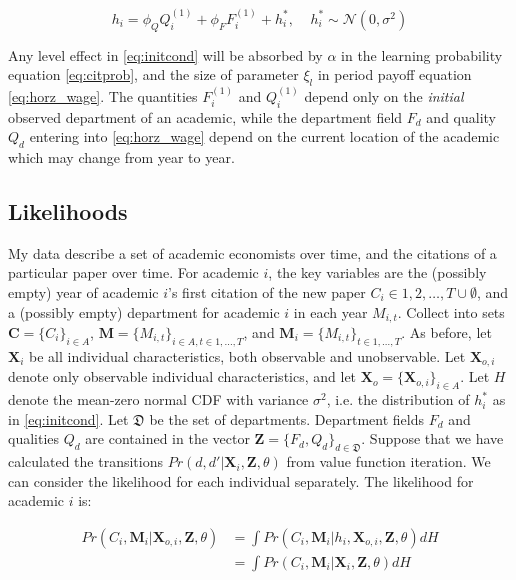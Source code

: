 \begin{equation}
    h_i = \phi_Q Q^{(1)}_i + \phi_F F^{(1)}_i + h^*_i, \ \ \ \ \  h^*_i \sim \mathcal{N}(0, \sigma^2)
    \label{eq:initcond}
\end{equation}

Any level effect in \eqref{eq:initcond} will be absorbed by $\alpha$ in the learning probability equation \eqref{eq:citprob}, and the size of parameter $\xi_l$ in period payoff equation \eqref{eq:horz_wage}. The quantities $F^{(1)}_i$ and $Q^{(1)}_i$ depend only on the \emph{initial} observed
department of an academic, while the department field $F_d$ and quality $Q_d$ entering
into \eqref{eq:horz_wage} depend on the current location of the academic which may change from year to year.

\subsection{Likelihoods}

My data describe a set of academic economists over time, and the citations of a particular paper over time.  For academic $i$, the key variables are the (possibly empty) year of academic $i$'s first citation
of the new paper $C_i \in 1,2,\dots, T \cup \emptyset$, and a (possibly empty) department for academic $i$ in each year $M_{i,t}$.  Collect into sets $\mathbf{C} = \{C_i\}_{i \in A}$,
$\mathbf{M} = \{M_{i,t}\}_{i \in A, t \in 1,\dots, T}$, and $\mathbf{M}_i = \{M_{i,t}\}_{t \in 1,\dots, T}$. 
 As before, let $\mathbf{X}_i$ be all individual characteristics, both observable and unobservable.  Let $\mathbf{X}_{o,i}$ denote only
 observable individual characteristics, and let $\mathbf{X}_o = \{\mathbf{X}_{o,i}\}_{i\in A}$. Let $H$ denote
the mean-zero normal CDF with variance $\sigma^2$, i.e. the distribution
of $h^*_i$ as in \eqref{eq:initcond}.  Let $\mathfrak{D}$ be the set of departments.  Department fields $F_d$ and qualities $Q_d$ are 
contained in the vector $\mathbf{Z} = \{F_d, Q_d\}_{d \in \mathfrak{D}}$. Suppose
that we have calculated the transitions $Pr(d,d'\vert \mathbf{X}_i, \mathbf{Z}, \theta)$ from
value function iteration. We can consider the likelihood for each
individual separately. The likelihood for academic $i$ is:

\begin{align}
    Pr(C_i,\mathbf{M}_i|\mathbf{X}_{o,i},\mathbf{Z},\theta) &= \int Pr(C_i,\mathbf{M}_i|h_i, \mathbf{X}_{o,i},\mathbf{Z},\theta) dH \nonumber \\
    &= \int Pr(C_i,\mathbf{M}_i|\mathbf{X}_i,\mathbf{Z},\theta) dH
    \label{eq:inth}
\end{align}

